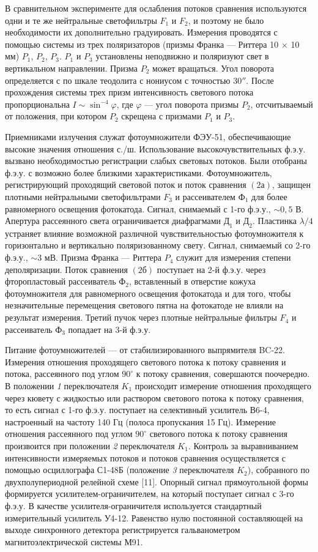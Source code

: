 В сравнительном эксперименте для ослабления потоков сравнения
используются одни и те же нейтральные светофильтры $F_1$ и $F_2$,
и поэтому не было необходимости их дополнительно градуировать.
Измерения проводятся с помощью системы из трех поляризаторов
(призмы Франка --- Риттера 10 $\times$ 10 мм) $P_1$, $P_2$,
$P_3$. $P_1$ и $P_3$ установлены неподвижно и поляризуют свет в
вертикальном направлении. Призма $P_2$ может вращаться. Угол
поворота определяется с по шкале теодолита с нониусом с точностью
30$''$. После прохождения системы трех призм интенсивность
светового потока пропорциональна $I\sim\sin^{-4}\varphi$, где
$\varphi$ --- угол поворота призмы $P_2$, отсчитываемый от
положения, при котором $P_2$ скрещена с призмами $P_1$ и $P_3$.


Приемниками излучения служат фотоумножители ФЭУ-51,
обеспечивающие высокие значения отношения с./ш. Использование
высокочувствительных ф.э.у. вызвано необходимостью регистрации
слабых световых потоков. Были отобраны ф.э.у. с возможно более
близкими характеристиками. Фотоумножитель, регистрирующий
проходящий световой поток и поток сравнения $(2а)$, защищен
плотными нейтральными светофильтрами $F_3$ и рассеивателем $Ф_1$
для более равномерного освещения фотокатода. Сигнал, снимаемый с
1-го ф.э.у., $\sim0,5$ В. Апертура рассеянного света
ограничивается диафрагмами $Д_1$ и $Д_2$. Пластинка $\lambda/4$
устраняет влияние возможной различной чувствительностью
фотоумножителя к горизонтально и вертикально поляризованному
свету. Сигнал, снимаемый со 2-го ф.э.у., $\sim3$ мВ. Призма
Франка --- Риттера $P_4$ служит для измерения степени
деполяризации. Поток сравнения $(2б)$ поступает на 2-й ф.э.у.
через фторопластовый рассеиватель $Ф_2$, вставленный в отверстие
кожуха фотоумножителя для равномерного освещения фотокатода и для
того, чтобы незначительные перемещения светового пятна на
фотокатоде не влияли на результат измерения. Третий пучок через
плотные нейтральные фильтры $F_4$ и рассеиватель $Ф_3$ попадает
на 3-й ф.э.у.

Питание фотоумножителей --- от стабилизированного выпрямителя
BC-22. Измерения отношения проходящего светового потока к потоку
сравнения и потока, рассеянного под углом $90^{\circ}$ к потоку
сравнения, совершаются поочередно. В положении {\it 1}
переключателя $K_1$ происходит измерение отношения проходящего
через кювету с жидкостью или раствором светового потока к потоку
сравнения, то есть сигнал с 1-го ф.э.у. поступает на селективный
усилитель В6-4, настроенный на частоту 140 Гц (полоса пропускания
15 Гц). Измерение отношения рассеянного под углом $90^{\circ}$
светового потока к потоку сравнения произвоится при положении
{\it 2} переключателя $K_1$. Контроль за выравниванием
интенсивности измеряемых потоков и потоков сравнения
осуществляется с помощью осциллографа С1-48Б (положение {\it 3}
переключателя $K_2$), собранного по двухполупериодной  релейной
схеме [11]. Опорный сигнал прямоугольной формы формируется
усилителем-ограничителем, на который поступает сигнал с 3-го
ф.э.у. В качестве усилителя-ограничителя используется стандартный
измерительный усилитель У4-12. Равенство нулю постоянной
составляющей на выходе синхронного детектора регистрируется
гальванометром магнитоэлектрической системы М91.

